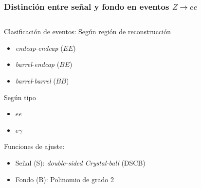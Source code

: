 \documentclass[10pt, compress,spanish]{beamer}
\begin{document}


\begin{frame}[fragile]
\frametitle{Distinción entre señal y fondo en eventos $Z\to ee$}

\normalsize



\begin{columns}

\begin{column}{0.5\textwidth}


\begin{block}{Clasificación de eventos:}
Según región de reconstrucción
\begin{itemize}

\item \textit{endcap}-\textit{endcap} ($EE$)

\item \textit{barrel}-\textit{endcap} ($BE$)

\item \textit{barrel}-\textit{barrel} ($BB$)

\end{itemize}

Según tipo
\begin{itemize}

\item $ee$

\item $e\gamma$

\end{itemize}

\begin{block}{Funciones de ajuste:}
\begin{itemize}

\item Señal (S): \textit{double-sided Crystal-ball} (DSCB)

\item Fondo (B): Polinomio de grado 2

\end{itemize}

\end{block}


\end{block}




\end{column}

\begin{column}{0.5\textwidth}


\end{column}
\end{columns}
\end{frame}
\end{document}
